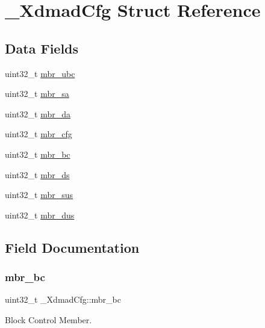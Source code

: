 \hypertarget{struct__XdmadCfg}{}\section{\+\_\+\+Xdmad\+Cfg Struct Reference}
\label{struct__XdmadCfg}
\subsection*{Data Fields}
\begin{DoxyCompactItemize}
\item 
uint32\+\_\+t \mbox{\hyperlink{struct__XdmadCfg_ad95ef2b80230c1a5452a41a62120ab65}{mbr\+\_\+ubc}}
\item 
uint32\+\_\+t \mbox{\hyperlink{struct__XdmadCfg_a96e6eb9b1a26b7364c5e8c7558eec46a}{mbr\+\_\+sa}}
\item 
uint32\+\_\+t \mbox{\hyperlink{struct__XdmadCfg_ad5cf84136517c0c4d7b97005af6a81b1}{mbr\+\_\+da}}
\item 
uint32\+\_\+t \mbox{\hyperlink{struct__XdmadCfg_acaace66fcc65069a466f04e8169fa0fc}{mbr\+\_\+cfg}}
\item 
uint32\+\_\+t \mbox{\hyperlink{struct__XdmadCfg_a1d273cf1eade4784aab200fc4a9832e3}{mbr\+\_\+bc}}
\item 
uint32\+\_\+t \mbox{\hyperlink{struct__XdmadCfg_aa6bc8288d7a64857d13c2d2488e0d6db}{mbr\+\_\+ds}}
\item 
uint32\+\_\+t \mbox{\hyperlink{struct__XdmadCfg_a1498060a769a26a2a920c06a32e6cf83}{mbr\+\_\+sus}}
\item 
uint32\+\_\+t \mbox{\hyperlink{struct__XdmadCfg_a86b6dda6f114e7b1e358325b249bb323}{mbr\+\_\+dus}}
\end{DoxyCompactItemize}


\subsection{Field Documentation}
\mbox{\label{struct__XdmadCfg_a1d273cf1eade4784aab200fc4a9832e3}} 
\subsubsection{\texorpdfstring{mbr\_bc}{mbr\_bc}}
{\footnotesize\ttfamily uint32\+\_\+t \+\_\+\+Xdmad\+Cfg\+::mbr\+\_\+bc}

Block Control Member. \mbox{\label{struct__XdmadCfg_acaace66fcc65069a466f04e8169fa0fc}} 
